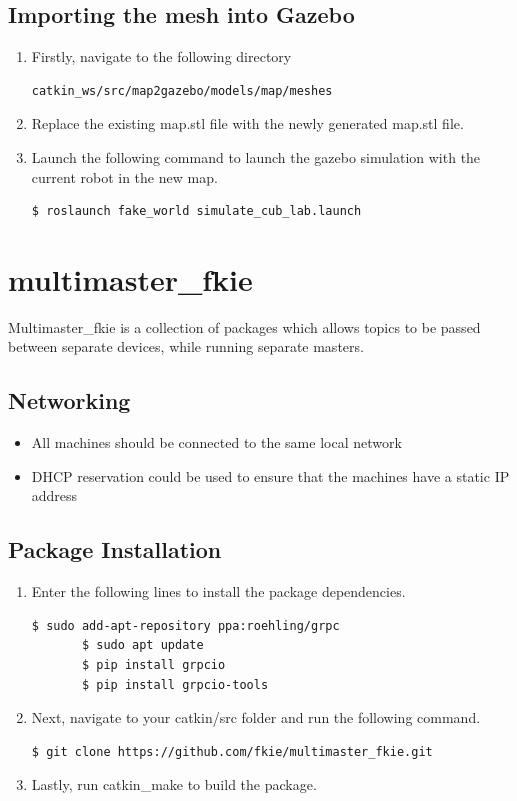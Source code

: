\documentclass[11pt]{article}
\begin{document}
\subsection{Importing the mesh into Gazebo}
\begin{enumerate}
 \item {
       Firstly, navigate to the following directory
       \begin{lstlisting}[language=bash]
 catkin_ws/src/map2gazebo/models/map/meshes
        \end{lstlisting}
       }
 \item {
       Replace the existing map.stl file with the newly generated map.stl file.
       }
 \item{
       Launch the following command to launch the gazebo simulation with the current robot in the new map.
       \begin{lstlisting}[language=bash]
       $ roslaunch fake_world simulate_cub_lab.launch
        \end{lstlisting}
       
       }
\end{enumerate}

\section{multimaster\_fkie}
Multimaster\_fkie is a collection of packages which allows topics to be passed between separate devices, while running separate masters.


\subsection{Networking}
\begin{itemize}
 \item { All machines should be connected to the same local network}
 \item{ DHCP reservation could be used to ensure that the machines have a static IP address}
\end{itemize}
\subsection{Package Installation }
\begin{enumerate}
 \item {
       Enter the following lines to install the package dependencies.
       \begin{lstlisting}[language=bash]
       $ sudo add-apt-repository ppa:roehling/grpc
       $ sudo apt update
       $ pip install grpcio
       $ pip install grpcio-tools
        \end{lstlisting}
       }
 \item{
       Next, navigate to your catkin/src folder and run the following command.
       \begin{lstlisting}[language=bash]
         $ git clone https://github.com/fkie/multimaster_fkie.git
        \end{lstlisting}
       }
 \item{
       Lastly, run catkin\_make to build the package.
       }
\end{enumerate}
\end{document}
